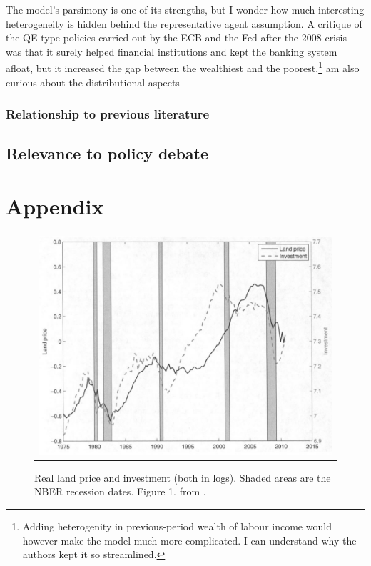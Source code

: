 \documentclass{amsart}
\theoremstyle{definition}
\theoremstyle{remark}
\numberwithin{equation}{section}
\begin{document}
The model's parsimony is one of its strengths, but I wonder how much interesting heterogeneity is hidden behind the representative agent assumption. A critique of the QE-type policies carried out by the ECB and the Fed after the 2008 crisis was that it surely helped financial institutions and kept the banking system afloat, but it increased the gap between the wealthiest and the poorest.\footnote{Adding heterogenity in previous-period wealth of labour income would however make the model much more complicated. I can understand why the authors kept it so streamlined.}
am also curious about the distributional aspects 

\subsubsection{Relationship to previous literature}

\subsection*{Relevance to policy debate}

\newpage




\newpage

\section*{Appendix}

\begin{figure}[h!]
    \centering
    \begin{tabular}{c}
        \includegraphics[width=0.8 \textwidth]{landpriceinvestment.JPG}
    \end{tabular}
    \caption{Real land price and investment (both in logs). Shaded areas are the NBER recession dates. Figure 1. from \cite{liu2013land}.}
    \label{fig:landpriceinvestment}
\end{figure}
\end{document}
